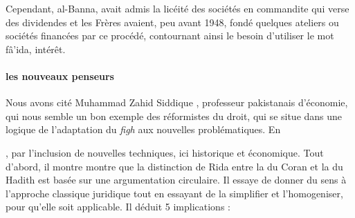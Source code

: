 Cependant, al-Banna, avait admis la licéité des sociétés en commandite qui verse des dividendes et les Frères avaient, peu avant 1948, fondé quelques ateliers
ou sociétés financées par ce procédé, contournant ainsi le besoin d'utiliser le mot fâ'ida, intérêt.


\paragraph{les nouveaux penseurs}  Nous avons cité Muhammad Zahid Siddique
\cite{Siddique:DemystifyingRiba}, professeur pakistanais d'économie, qui nous semble un bon exemple des réformistes du droit, qui se situe dans une logique de l'adaptation du \emph{figh} aux nouvelles problématiques. En 


, par l'inclusion de nouvelles techniques, ici historique et économique. Tout d'abord, il montre montre que la distinction de Rida entre la \riba du Coran et la \riba du Hadith est basée sur une argumentation circulaire. Il essaye de donner du sens à l'approche classique juridique tout en essayant de la simplifier et l'homogeniser, pour qu'elle soit applicable. Il déduit 5 implications : 

